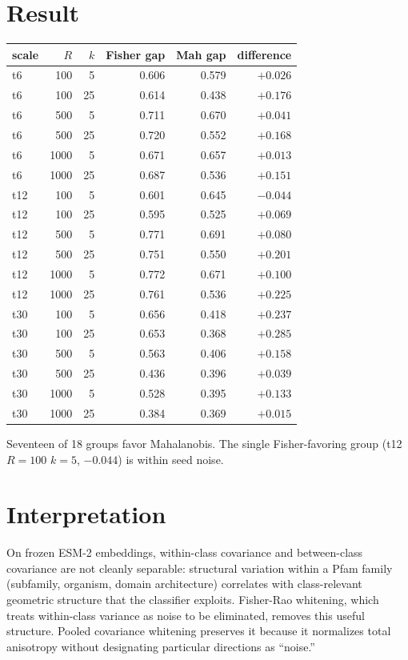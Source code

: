 \documentclass[11pt]{article}
\begin{document}
\section{Result}
\begin{center}
\small
\begin{tabular}{lrrrrr}
\toprule
scale & $R$ & $k$ & Fisher gap & Mah gap & difference \\
\midrule
t6  & 100  & 5  & 0.606 & 0.579 & $+0.026$ \\
t6  & 100  & 25 & 0.614 & 0.438 & $+0.176$ \\
t6  & 500  & 5  & 0.711 & 0.670 & $+0.041$ \\
t6  & 500  & 25 & 0.720 & 0.552 & $+0.168$ \\
t6  & 1000 & 5  & 0.671 & 0.657 & $+0.013$ \\
t6  & 1000 & 25 & 0.687 & 0.536 & $+0.151$ \\
t12 & 100  & 5  & 0.601 & 0.645 & $-0.044$ \\
t12 & 100  & 25 & 0.595 & 0.525 & $+0.069$ \\
t12 & 500  & 5  & 0.771 & 0.691 & $+0.080$ \\
t12 & 500  & 25 & 0.751 & 0.550 & $+0.201$ \\
t12 & 1000 & 5  & 0.772 & 0.671 & $+0.100$ \\
t12 & 1000 & 25 & 0.761 & 0.536 & $+0.225$ \\
t30 & 100  & 5  & 0.656 & 0.418 & $+0.237$ \\
t30 & 100  & 25 & 0.653 & 0.368 & $+0.285$ \\
t30 & 500  & 5  & 0.563 & 0.406 & $+0.158$ \\
t30 & 500  & 25 & 0.436 & 0.396 & $+0.039$ \\
t30 & 1000 & 5  & 0.528 & 0.395 & $+0.133$ \\
t30 & 1000 & 25 & 0.384 & 0.369 & $+0.015$ \\
\bottomrule
\end{tabular}
\end{center}

Seventeen of 18 groups favor Mahalanobis. The single Fisher-favoring group (t12 $R{=}100$ $k{=}5$, $-0.044$) is within seed noise.

\section{Interpretation}
On frozen ESM-2 embeddings, within-class covariance and between-class covariance are not cleanly separable: structural variation within a Pfam family (subfamily, organism, domain architecture) correlates with class-relevant geometric structure that the classifier exploits. Fisher-Rao whitening, which treats within-class variance as noise to be eliminated, removes this useful structure. Pooled covariance whitening preserves it because it normalizes total anisotropy without designating particular directions as ``noise.''
\end{document}
